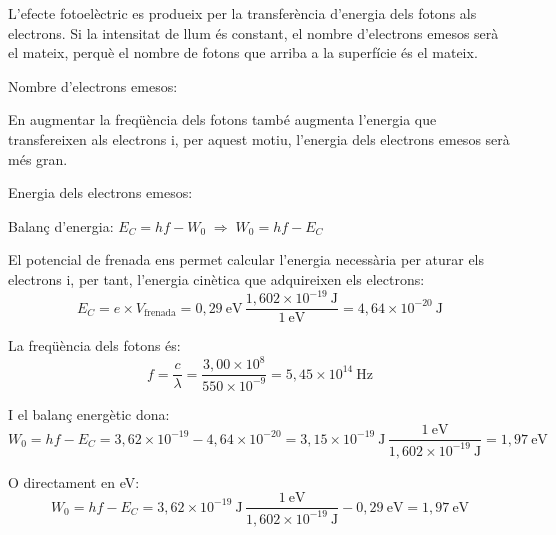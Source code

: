 \begin{solapartat}
 L'efecte fotoelèctric es produeix per la transferència d'energia dels fotons als electrons. Si la intensitat de llum és constant, el nombre d'electrons emesos serà el mateix, perquè el nombre de fotons que arriba a la superfície és el mateix.

Nombre d'electrons emesos: 

 En augmentar la freqüència dels fotons també augmenta l'energia que transfereixen als electrons i, per aquest motiu, l'energia dels electrons emesos serà més gran.

Energia dels electrons emesos: 
\end{solapartat}

\begin{solapartat}
 Balanç d'energia: $E_C = hf - W_0 \;\Rightarrow\; W_0 = hf - E_C$

 El potencial de frenada ens permet calcular l'energia necessària per aturar els electrons i, per tant, l'energia cinètica que adquireixen els electrons:
\[ E_C = e\times V_\mathrm{frenada} = 0,29\ \mathrm{eV}\,\frac{1,602\times 10^{-19}\ \mathrm{J}}{1\ \mathrm{eV}} = 4,64\times 10^{-20}\ \mathrm{J} \]

 La freqüència dels fotons és:
\[ f = \frac{c}{\lambda} = \frac{3,00\times 10^{8}}{550\times 10^{-9}} = 5,45\times 10^{14}\ \mathrm{Hz} \]

 I el balanç energètic dona:
\[ W_0 = hf - E_C = 3,62\times 10^{-19} - 4,64\times 10^{-20} = 3,15\times 10^{-19}\ \mathrm{J}\,\frac{1\ \mathrm{eV}}{1,602\times 10^{-19}\ \mathrm{J}} = 1,97\ \mathrm{eV} \]

O directament en eV:
\[ W_0 = hf - E_C = 3,62\times 10^{-19}\ \mathrm{J}\,\frac{1\ \mathrm{eV}}{1,602\times 10^{-19}\ \mathrm{J}} - 0,29\ \mathrm{eV} = 1,97\ \mathrm{eV} \]
\end{solapartat}
